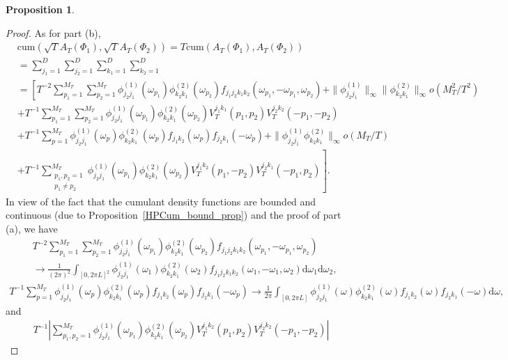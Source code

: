 \documentclass[11pt]{article}
\numberwithin{equation}{section}
\theoremstyle{plain}
\theoremstyle{definition}
\theoremstyle{definition}
\theoremstyle{assumption}
\theoremstyle{proposition}
\newtheorem{proposition}{Proposition}[section]
\theoremstyle{proposition}
\theoremstyle{example}
\theoremstyle{lemma}
\theoremstyle{theorem}
\theoremstyle{remark}
\begin{document}
\begin{proposition}
\begin{proof}
As for part (b),
\begin{align*}
&\mathrm{cum}(\sqrt{T}A_T(\Phi_1), \sqrt{T}A_T(\Phi_2)) 
=T\mathrm{cum}(A_T(\Phi_1), A_T(\Phi_2)) \\
&=\sum_{j_1=1}^{D} \sum_{j_2=1}^{D}\sum_{k_1=1}^{D} \sum_{k_2=1}^{D} \\
&=\left[T^{-2}\sum_{p_1=1}^{M_T}\sum_{p_2=1}^{M_T}\phi_{j_2 j_1}^{(1)}(\omega_{p_1}) \phi_{k_2 k_1}^{(2)}(\omega_{p_2})f_{j_1 j_2 k_1 k_2}(\omega_{p_1},-\omega_{p_1},\omega_{p_2}) 
+ \|\phi_{j_2 j_1}^{(1)}\|_{\infty}\|\phi_{k_2 k_1}^{(2)}\|_{\infty}o(M_T^2/T^2 ) \right. \\
&+T^{-1}\sum_{p_1=1}^{M_T}\sum_{p_2=1}^{M_T}\phi_{j_2 j_1}^{(1)}(\omega_{p_1}) \phi_{k_2 k_1}^{(2)}(\omega_{p_2}) V_{T}^{j_1 k_1}(p_1,p_2) V_{T}^{j_2 k_2}(-p_1,-p_2) \\
&+ T^{-1}\sum_{p=1}^{M_T}\phi_{j_2 j_1}^{(1)}(\omega_{p}) \phi_{k_2 k_1}^{(2)}(\omega_{p}) f_{j_1 k_2}(\omega_p)f_{j_2 k_1}(-\omega_p)
+ \|\phi_{j_2 j_1}^{(1)}\phi_{k_2 k_1}^{(2)}\|_{\infty}o(M_T/T )\\
&\left.+T^{-1}\sum_{\substack{p_1,p_2=1 \\ p_1\neq p_2}}^{M_T}\phi_{j_2 j_1}^{(1)}(\omega_{p_1}) \phi_{k_2 k_1}^{(2)}(\omega_{p_2}) V_{T}^{j_1 k_2}(p_1,-p_2) V_{T}^{j_2 k_1}(-p_1,p_2) \right].
\end{align*}
In view of the fact that the cumulant density functions are bounded and continuous (due to Proposition~\ref{HPCum_bound_prop}) and the proof of part (a), we have
\begin{align*}
&T^{-2}\sum_{p_1=1}^{M_T}\sum_{p_2=1}^{M_T}\phi_{j_2 j_1}^{(1)}(\omega_{p_1}) \phi_{k_2 k_1}^{(2)}(\omega_{p_2})f_{j_1 j_2 k_1 k_2}(\omega_{p_1},-\omega_{p_1},\omega_{p_2})  \\
&\rightarrow \frac{1}{(2\pi)^2}\int_{[0,2\pi L]^2} \phi_{j_2 j_1}^{(1)}(\omega_{1}) \phi_{k_2 k_1}^{(2)}(\omega_{2})f_{j_1 j_2 k_1 k_2}(\omega_{1},-\omega_{1},\omega_{2})\mathrm{d}\omega_1\mathrm{d}\omega_2 ,
\end{align*}
\begin{align*}
T^{-1}\sum_{p=1}^{M_T}\phi_{j_2 j_1}^{(1)}(\omega_{p}) \phi_{k_2 k_1}^{(2)}(\omega_{p}) f_{j_1 k_2}(\omega_p)f_{j_2 k_1}(-\omega_p)
\rightarrow \frac{1}{2\pi}\int_{[0,2\pi L]}\phi_{j_2 j_1}^{(1)}(\omega) \phi_{k_2 k_1}^{(2)}(\omega) f_{j_1 k_2}(\omega)f_{j_2 k_1}(-\omega)\mathrm{d}\omega  ,
\end{align*} 
and
\begin{align*}
T^{-1}\left|\sum_{p_1,p_2=1}^{M_T}\phi_{j_2 j_1}^{(1)}(\omega_{p_1}) \phi_{k_2 k_1}^{(2)}(\omega_{p_2})V_{T}^{j_1 k_2}(p_1,p_2) V_{T}^{j_2 k_2}(-p_1,-p_2) \right|

\end{align*}
\end{proof}
\end{proposition}
\end{document}
